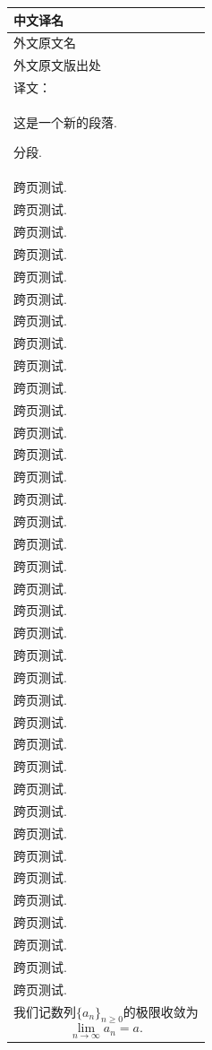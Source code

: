 \documentclass{article}
\theoremstyle{definition}
\theoremstyle{remark}
\newcommand{\p}[1]{\multicolumn{2}{|p{16cm}|}{
#1
} \\}
\begin{document}


\setcounter{page}{1}
\begin{flushleft}
\begin{longtable}{|l|l|}

\endfirsthead

\hline
\endhead

\hline
\endfoot

\hline
\endlastfoot

\hline
中文译名 &  \\
\hline
外文原文名 & \\
\hline
外文原文版出处 & \\
\hline
\multicolumn{2}{|p{15.5cm}|}{译文：} \\
\p{
这是一个新的段落. 

分段. 
}
\p{
跨页测试. 
}
\p{
跨页测试. 
}
\p{
跨页测试. 
}
\p{
跨页测试. 
}
\p{
跨页测试. 
}
\p{
跨页测试. 
}
\p{
跨页测试. 
}
\p{
跨页测试. 
}
\p{
跨页测试. 
}
\p{
跨页测试. 
}
\p{
跨页测试. 
}
\p{
跨页测试. 
}
\p{
跨页测试. 
}
\p{
跨页测试. 
}
\p{
跨页测试. 
}
\p{
跨页测试. 
}
\p{
跨页测试. 
}
\p{
跨页测试. 
}
\p{
跨页测试. 
}
\p{
跨页测试. 
}
\p{
跨页测试. 
}
\p{
跨页测试. 
}
\p{
跨页测试. 
}
\p{
跨页测试. 
}
\p{
跨页测试. 
}
\p{
跨页测试. 
}
\p{
跨页测试. 
}
\p{
跨页测试. 
}
\p{
跨页测试. 
}
\p{
跨页测试. 
}
\p{
跨页测试. 
}
\p{
跨页测试. 
}
\p{
跨页测试. 
}
\p{
跨页测试. 
}
\p{
跨页测试. 
}
\p{
跨页测试. 
}
\p{
跨页测试. 
}
\p{
我们记数列$\{a_n\}_{n\geq 0}$的极限收敛为
\[
\lim_{n \to \infty} a_n = a. 
\]
}
\end{longtable}
\end{flushleft}
\end{document}

